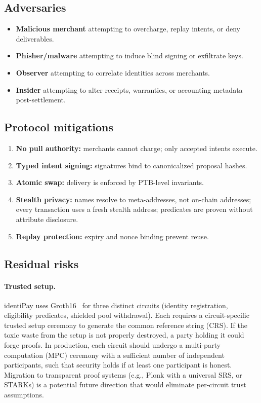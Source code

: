 \documentclass[11pt]{article}
\begin{document}
\subsection{Adversaries}
\begin{itemize}
  \item \textbf{Malicious merchant} attempting to overcharge, replay intents, or deny deliverables.
  \item \textbf{Phisher/malware} attempting to induce blind signing or exfiltrate keys.
  \item \textbf{Observer} attempting to correlate identities across merchants.
  \item \textbf{Insider} attempting to alter receipts, warranties, or accounting metadata post-settlement.
\end{itemize}

\subsection{Protocol mitigations}
\begin{enumerate}
  \item \textbf{No pull authority:} merchants cannot charge; only accepted intents execute.
  \item \textbf{Typed intent signing:} signatures bind to canonicalized proposal hashes.
  \item \textbf{Atomic swap:} delivery is enforced by PTB-level invariants.
  \item \textbf{Stealth privacy:} names resolve to meta-addresses, not on-chain addresses; every transaction uses a fresh stealth address; predicates are proven without attribute disclosure.
  \item \textbf{Replay protection:} expiry and nonce binding prevent reuse.
\end{enumerate}

\subsection{Residual risks}
\paragraph{Trusted setup.}
identiPay uses Groth16~\cite{groth16} for three distinct circuits (identity registration, eligibility predicates, shielded pool withdrawal). Each requires a circuit-specific trusted setup ceremony to generate the common reference string (CRS). If the toxic waste from the setup is not properly destroyed, a party holding it could forge proofs. In production, each circuit should undergo a multi-party computation (MPC) ceremony with a sufficient number of independent participants, such that security holds if at least one participant is honest. Migration to transparent proof systems (e.g., Plonk with a universal SRS, or STARKs) is a potential future direction that would eliminate per-circuit trust assumptions.
\end{document}
